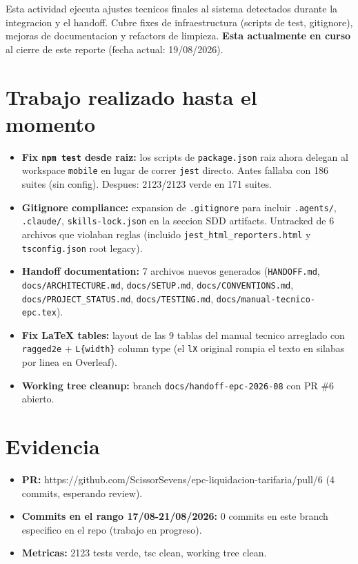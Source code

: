 \documentclass[11pt,a4paper,oneside]{report}
\begin{document}
Esta actividad ejecuta ajustes tecnicos finales al sistema detectados durante la integracion y el handoff. Cubre fixes de infraestructura (scripts de test, gitignore), mejoras de documentacion y refactors de limpieza. \textbf{Esta actualmente en curso} al cierre de este reporte (fecha actual: 19/08/2026).

\section{Trabajo realizado hasta el momento}

\begin{itemize}[leftmargin=*]
    \item \textbf{Fix \texttt{npm test} desde raiz:} los scripts de \texttt{package.json} raiz ahora delegan al workspace \texttt{mobile} en lugar de correr \texttt{jest} directo. Antes fallaba con 186 suites (sin config). Despues: 2123/2123 verde en 171 suites.
    \item \textbf{Gitignore compliance:} expansion de \texttt{.gitignore} para incluir \texttt{.agents/}, \texttt{.claude/}, \texttt{skills-lock.json} en la seccion SDD artifacts. Untracked de 6 archivos que violaban reglas (incluido \texttt{jest\_html\_reporters.html} y \texttt{tsconfig.json} root legacy).
    \item \textbf{Handoff documentation:} 7 archivos nuevos generados (\texttt{HANDOFF.md}, \texttt{docs/ARCHITECTURE.md}, \texttt{docs/SETUP.md}, \texttt{docs/CONVENTIONS.md}, \texttt{docs/PROJECT\_STATUS.md}, \texttt{docs/TESTING.md}, \texttt{docs/manual-tecnico-epc.tex}).
    \item \textbf{Fix LaTeX tables:} layout de las 9 tablas del manual tecnico arreglado con \texttt{ragged2e} + \texttt{L\{width\}} column type (el \texttt{lX} original rompia el texto en silabas por linea en Overleaf).
    \item \textbf{Working tree cleanup:} branch \texttt{docs/handoff-epc-2026-08} con PR \#6 abierto.
\end{itemize}

\section{Evidencia}

\begin{itemize}[leftmargin=*]
    \item \textbf{PR:} https://github.com/ScissorSevens/epc-liquidacion-tarifaria/pull/6 (4 commits, esperando review).
    \item \textbf{Commits en el rango 17/08-21/08/2026:} 0 commits en este branch especifico en el repo (trabajo en progreso).
    \item \textbf{Metricas:} 2123 tests verde, tsc clean, working tree clean.
\end{itemize}
\end{document}
